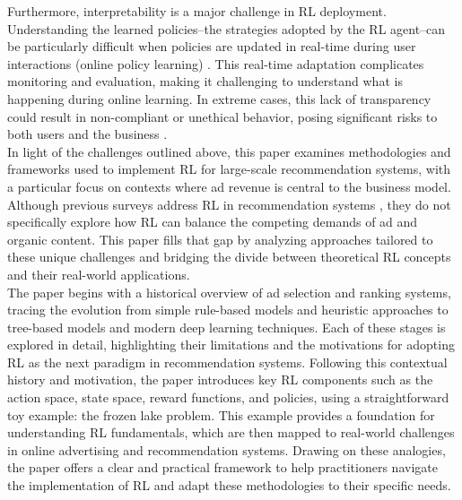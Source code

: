 \documentclass[final]{anthology-ch}         %
\begin{document}
Furthermore, interpretability is a major challenge in RL deployment. Understanding the learned policies--the strategies adopted by the RL agent--can be particularly difficult when policies are updated in real-time during user interactions (online policy learning) \cite{glanois2024survey} \cite{vouros2022explainable} \cite{dulac2019challenges}. This real-time adaptation complicates monitoring and evaluation, making it challenging to understand what is happening during online learning. In extreme cases, this lack of transparency could result in non-compliant or unethical behavior, posing significant risks to both users and the business \cite{lambert2023entangled}.\\

In light of the challenges outlined above, this paper examines methodologies and frameworks used to implement RL for large-scale recommendation systems, with a particular focus on contexts where ad revenue is central to the business model. Although previous surveys address RL in recommendation systems \cite{lin2023survey, afsar2022reinforcement}, they do not specifically explore how RL can balance the competing demands of ad and organic content. This paper fills that gap by analyzing approaches tailored to these unique challenges and bridging the divide between theoretical RL concepts and their real-world applications.
\\

The paper begins with a historical overview of ad selection and ranking systems, tracing the evolution from simple rule-based models and heuristic approaches to tree-based models and modern deep learning techniques. Each of these stages is explored in detail, highlighting their limitations and the motivations for adopting RL as the next paradigm in recommendation systems. Following this contextual history and motivation, the paper introduces key RL components such as the action space, state space, reward functions, and policies, using a straightforward toy example: the frozen lake problem. This example provides a foundation for understanding RL fundamentals, which are then mapped to real-world challenges in online advertising and recommendation systems. Drawing on these analogies, the paper offers a clear and practical framework to help practitioners navigate the implementation of RL and adapt these methodologies to their specific needs.


\end{document}

